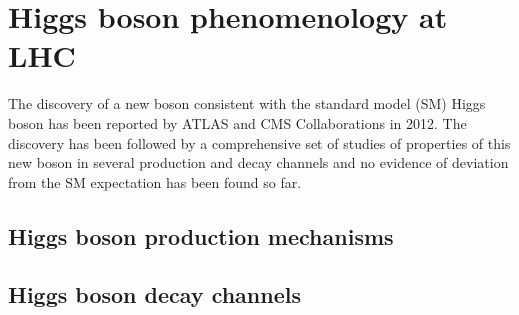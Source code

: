 \section{Higgs boson phenomenology at LHC}
\label{sec:HiggsBosonLHC}

The discovery of a new boson consistent with the standard model (SM) Higgs boson has
been reported by ATLAS and CMS Collaborations in 2012. The discovery has been followed
by a comprehensive set of studies of properties of this new boson in several production and
decay channels and no evidence of deviation from the SM expectation has been found so
far.


\subsection{Higgs boson production mechanisms}



\subsection{Higgs boson decay channels}

